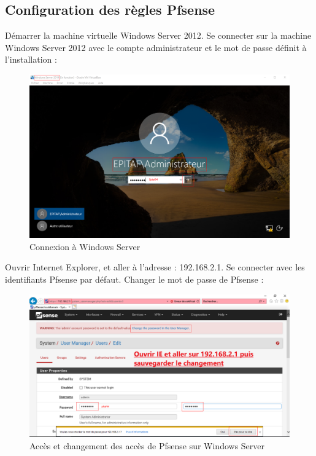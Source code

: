 \newpage
\subsection{Configuration des règles Pfsense}

Démarrer la machine virtuelle Windows Server 2012. Se connecter sur la machine Windows Server 2012 avec le compte administrateur et le mot de passe définit à l'installation :
\begin{figure}[h!]
	\begin{center}
		\includegraphics[scale=0.5]{Pfsense_Screeshots/19.png}
		\caption{Connexion à Windows Server}
		\label{Pfsense_Screeshots/19}
	\end{center}
\end{figure}
\FloatBarrier

\newpage
Ouvrir Internet Explorer, et aller à l'adresse : 192.168.2.1. Se connecter avec les identifiants Pfsense par défaut. Changer le mot de passe de Pfsense :
\begin{figure}[h!]
	\begin{center}
		\includegraphics[scale=0.2]{Pfsense_Screeshots/20.png}
		\caption{Accès et changement des accès de Pfsense sur Windows Server}
		\label{Pfsense_Screeshots/20}
	\end{center}
\end{figure}
\FloatBarrier    

